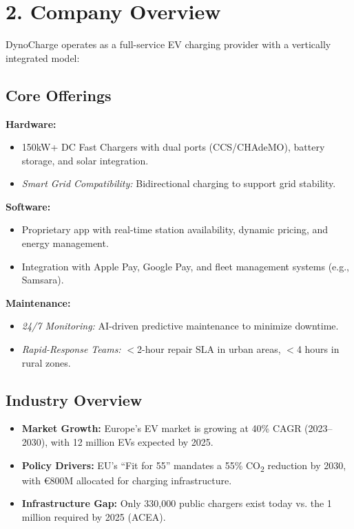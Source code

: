 
\section{2. Company Overview}
DynoCharge operates as a full-service EV charging provider with a vertically integrated model:

\subsection*{Core Offerings}

\textbf{Hardware:}
\begin{itemize}
    \item 150kW+ DC Fast Chargers with dual ports (CCS/CHAdeMO), battery storage, and solar integration.
    \item \textit{Smart Grid Compatibility:} Bidirectional charging to support grid stability.
\end{itemize}

\textbf{Software:}
\begin{itemize}
    \item Proprietary app with real-time station availability, dynamic pricing, and energy management.
    \item Integration with Apple Pay, Google Pay, and fleet management systems (e.g., Samsara).
\end{itemize}

\textbf{Maintenance:}
\begin{itemize}
    \item \textit{24/7 Monitoring:} AI-driven predictive maintenance to minimize downtime.
    \item \textit{Rapid-Response Teams:} $<$2-hour repair SLA in urban areas, $<$4 hours in rural zones.
\end{itemize}

\subsection*{Industry Overview}
\begin{itemize}
\item \textbf{Market Growth:} Europe’s EV market is growing at 40\% CAGR (2023--2030), with 12 million EVs expected by 2025.

\item \textbf{Policy Drivers:} EU’s ``Fit for 55'' mandates a 55\% CO\textsubscript{2} reduction by 2030, with €800M allocated for charging infrastructure.

\item \textbf{Infrastructure Gap:} Only 330,000 public chargers exist today vs. the 1 million required by 2025 (ACEA).
\end{itemize}